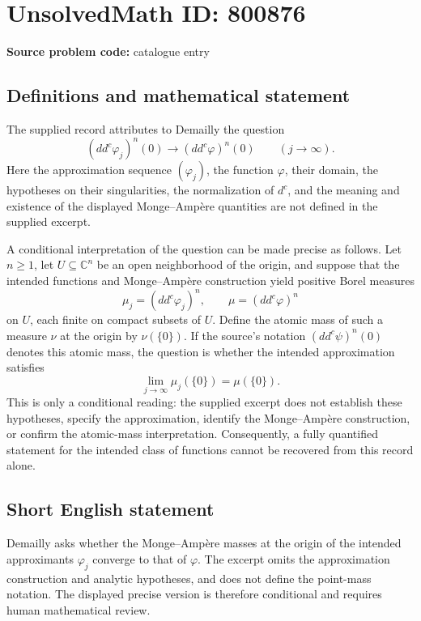 \documentclass[11pt]{article}
\newcommand{\C}{\mathbb{C}}
\begin{document}
\section*{UnsolvedMath ID: 800876}
\textbf{Source problem code:} catalogue entry
\subsection{Definitions and mathematical statement}
The supplied record attributes to Demailly the question
\[
(dd^c\varphi_j)^n(0)\longrightarrow(dd^c\varphi)^n(0)
\qquad (j\to\infty).
\]
Here the approximation sequence \((\varphi_j)\), the function \(\varphi\), their domain, the hypotheses on their singularities, the normalization of \(d^c\), and the meaning and existence of the displayed Monge--Amp\`ere quantities are not defined in the supplied excerpt.

A conditional interpretation of the question can be made precise as follows. Let \(n\geq1\), let \(U\subseteq\C^n\) be an open neighborhood of the origin, and suppose that the intended functions and Monge--Amp\`ere construction yield positive Borel measures
\[
\mu_j=(dd^c\varphi_j)^n,\qquad \mu=(dd^c\varphi)^n
\]
on \(U\), each finite on compact subsets of \(U\). Define the atomic mass of such a measure \(\nu\) at the origin by \(\nu(\{0\})\). If the source's notation \((dd^c\psi)^n(0)\) denotes this atomic mass, the question is whether the intended approximation satisfies
\[
\lim_{j\to\infty}\mu_j(\{0\})=\mu(\{0\}).
\]
This is only a conditional reading: the supplied excerpt does not establish these hypotheses, specify the approximation, identify the Monge--Amp\`ere construction, or confirm the atomic-mass interpretation. Consequently, a fully quantified statement for the intended class of functions cannot be recovered from this record alone.
\subsection{Short English statement}
Demailly asks whether the Monge--Amp\`ere masses at the origin of the intended approximants \(\varphi_j\) converge to that of \(\varphi\). The excerpt omits the approximation construction and analytic hypotheses, and does not define the point-mass notation. The displayed precise version is therefore conditional and requires human mathematical review.
\end{document}
